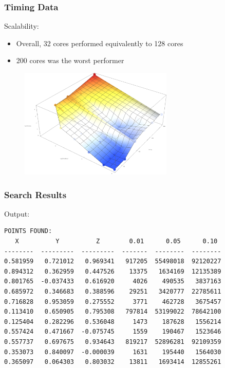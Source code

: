 \documentclass[usernames,dvipsnames]{beamer}
\begin{document}

\begin{frame}[fragile]	
	\frametitle{Timing Data}
	
        	\begin{block}{Scalability:}
        		\begin{itemize}
        			\item Overall, 32 cores performed equivalently to 128 cores
        			\item 200 cores was the worst performer
        		\end{itemize}
        	\end{block}
        	\begin{figure}
            \centering
	        \includegraphics[width=0.65\textwidth]{images/runtimes.png}
	        \end{figure}
\end{frame}


\begin{frame}[fragile]	
	\frametitle{Search Results}
	
        	\begin{block}{Output:}
\begin{verbatim}
POINTS FOUND:
   X          Y          Z        0.01      0.05      0.10
--------  ---------  ---------  -------  --------  --------
0.581959   0.721012   0.969341   917205  55498018  92120227
0.894312   0.362959   0.447526    13375   1634169  12135389
0.801765  -0.037433   0.616920     4026    490535   3837163
0.685972   0.346683   0.388596    29251   3420777  22785611
0.716828   0.953059   0.275552     3771    462728   3675457
0.113410   0.650905   0.795308   797814  53199022  78642100
0.125404   0.282296   0.536048     1473    187628   1556214
0.557424   0.471667  -0.075745     1559    190467   1523646
0.557737   0.697675   0.934643   819217  52896281  92109359
0.353073   0.840097  -0.000039     1631    195440   1564030
0.365097   0.064303   0.803032    13811   1693414  12855261
\end{verbatim}
        	\end{block}
\end{frame}
\end{document}
